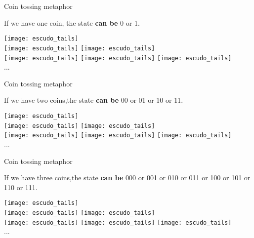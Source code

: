 \documentclass[aspectratio=43]{beamer}
\begin{document}
\begin{frame}{Coin tossing metaphor}
	\begin{cardTiny}
		If we have one coin, the state \textbf{can be} 0 or 1.
	\end{cardTiny}
    \begin{center}
        \texttt{[image: escudo\_tails]}\\
        \texttt{[image: escudo\_tails]}
        \texttt{[image: escudo\_tails]}\\
        \texttt{[image: escudo\_tails]}
        \texttt{[image: escudo\_tails]}
        \texttt{[image: escudo\_tails]}\\...
	\end{center}
\pagenumber
\end{frame}

\begin{frame}{Coin tossing metaphor}
	\begin{cardTiny}
		If we have two coins,the state \textbf{can be} 00 or 01 or 10 or 11. 
	\end{cardTiny}
    \begin{center}
        \texttt{[image: escudo\_tails]}\\
        \texttt{[image: escudo\_tails]}
        \texttt{[image: escudo\_tails]}\\
        \texttt{[image: escudo\_tails]}
        \texttt{[image: escudo\_tails]}
        \texttt{[image: escudo\_tails]}\\...
	\end{center}
\pagenumber
\end{frame}

\begin{frame}{Coin tossing metaphor}
	\begin{cardTiny}
		If we have three coins,the state \textbf{can be} 000 or 001 or 010 or 011 or 100 or 101 or 110 or 111. 
	\end{cardTiny}
    \begin{center}
        \texttt{[image: escudo\_tails]}\\
        \texttt{[image: escudo\_tails]}
        \texttt{[image: escudo\_tails]}\\
        \texttt{[image: escudo\_tails]}
        \texttt{[image: escudo\_tails]}
        \texttt{[image: escudo\_tails]}\\...
	\end{center}
\pagenumber
\end{frame}
\end{document}
